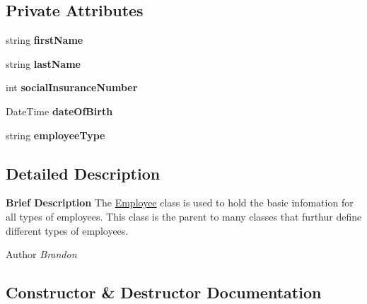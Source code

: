\subsection*{Private Attributes}
\begin{DoxyCompactItemize}
\item 
\hypertarget{class_all_employees_1_1_employee_a04c4c16015aa2d889fd2042ce4b8a1d7}{}string {\bfseries first\+Name}\label{class_all_employees_1_1_employee_a04c4c16015aa2d889fd2042ce4b8a1d7}

\item 
\hypertarget{class_all_employees_1_1_employee_ac3721b61919ca9cd29a400620562170e}{}string {\bfseries last\+Name}\label{class_all_employees_1_1_employee_ac3721b61919ca9cd29a400620562170e}

\item 
\hypertarget{class_all_employees_1_1_employee_a31f55bb91fe0871c5d9a3cb77f44a4df}{}int {\bfseries social\+Insurance\+Number}\label{class_all_employees_1_1_employee_a31f55bb91fe0871c5d9a3cb77f44a4df}

\item 
\hypertarget{class_all_employees_1_1_employee_a00f33298e4408f0a0402a34c9aa2067a}{}Date\+Time {\bfseries date\+Of\+Birth}\label{class_all_employees_1_1_employee_a00f33298e4408f0a0402a34c9aa2067a}

\item 
\hypertarget{class_all_employees_1_1_employee_a246198254823dc5a10197029b17479b4}{}string {\bfseries employee\+Type}\label{class_all_employees_1_1_employee_a246198254823dc5a10197029b17479b4}

\end{DoxyCompactItemize}


\subsection{Detailed Description}
{\bfseries Brief Description} The \hyperlink{class_all_employees_1_1_employee}{Employee} class is used to hold the basic infomation for all types of employees. This class is the parent to many classes that furthur define different types of employees. 

\begin{DoxyAuthor}{Author}
{\itshape Brandon} 
\end{DoxyAuthor}


\subsection{Constructor \& Destructor Documentation}
\hypertarget{class_all_employees_1_1_employee_ac3aa5a59bf1ddba2c45cc933bf897e04}{}
